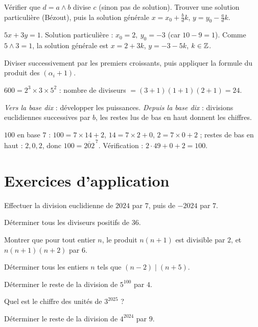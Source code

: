 Vérifier que $d=a\wedge b$ divise $c$ (sinon pas de solution). Trouver une solution particulière (Bézout), puis la solution générale $x=x_0+\frac{b}{d}k$, $y=y_0-\frac{a}{d}k$.
\begin{exemple}
$5x+3y=1$. Solution particulière : $x_0=2,\ y_0=-3$ (car $10-9=1$). Comme $5\wedge3=1$, la solution générale est $x=2+3k$, $y=-3-5k$, $k\in\mathbb{Z}$.
\end{exemple}

Diviser successivement par les premiers croissants, puis appliquer la formule du produit des $(\alpha_i+1)$.
\begin{exemple}
$600=2^3\times3\times5^2$ : nombre de diviseurs $=(3{+}1)(1{+}1)(2{+}1)=24$.
\end{exemple}

\emph{Vers la base dix} : développer les puissances. \emph{Depuis la base dix} : divisions euclidiennes successives par $b$, les restes lus de bas en haut donnent les chiffres.
\begin{exemple}
$100$ en base $7$ : $100=7\times14+2$, $14=7\times2+0$, $2=7\times0+2$ ; restes de bas en haut : $2,0,2$, donc $100=\overline{202}^{\,7}$. Vérification : $2\cdot49+0+2=100$.
\end{exemple}

\section{Exercices d'application}

\exo{} Effectuer la division euclidienne de $2024$ par $7$, puis de $-2024$ par $7$.

\exo{} Déterminer tous les diviseurs positifs de $36$.

\exo{} Montrer que pour tout entier $n$, le produit $n(n+1)$ est divisible par $2$, et $n(n+1)(n+2)$ par $6$.

\exo{} Déterminer tous les entiers $n$ tels que $(n-2)\mid(n+5)$.

\exo{} Déterminer le reste de la division de $5^{100}$ par $4$.

\exo{} Quel est le chiffre des unités de $3^{2025}$ ?

\exo{} Déterminer le reste de la division de $4^{2024}$ par $9$.

